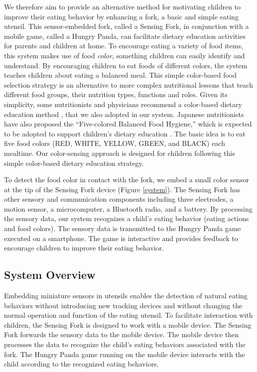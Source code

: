 We therefore aim to provide an alternative method for motivating children 
to improve their eating behavior by enhancing a fork, a basic and simple eating utensil. 
This sensor-embedded fork, called a Sensing Fork, in conjunction with a mobile game, 
called a Hungry Panda, can facilitate dietary education activities 
for parents and children at home. 
To encourage eating a variety of food items, this system makes use of food \textit{color}, 
something children can easily identify and understand. 
By encouraging children to eat foods of different colors, 
the system teaches children about eating a balanced meal. 
This simple color-based food selection strategy is an alternative 
to more complex nutritional lessons that teach different food groups, 
their nutrition types, functions and roles. 
Given its simplicity, some nutritionists and 
physicians recommend a color-based dietary education method \cite{Blackburn:2005}, 
that we also adopted in our system. Japanese nutritionists have also proposed 
the ``Five-colored Balanced Food Hygiene,'' which is expected to be adopted 
to support children's dietary education \cite{goshoku}. 
The basic idea is to eat five food colors (RED, WHITE, YELLOW, GREEN, and BLACK) each mealtime. 
Our color-sensing approach is designed for children 
following this simple color-based dietary education strategy.

To detect the food color in contact with the fork, we embed a small color sensor 
at the tip of the Sensing Fork device (Figure \ref{system}). 
The Sensing Fork has other sensory and communication components including three electrodes, 
a motion sensor, a microcomputer, a Bluetooth radio, and a battery. 
By processing the sensory data, 
our system recognizes a child's eating behavior (eating actions and food colors). 
The sensory data is transmitted to the Hungry Panda game executed on a smartphone. 
The game is interactive and provides feedback 
to encourage children to improve their eating behavior.

\subsection{System Overview}
Embedding miniature sensors in utensils enables the detection of natural eating behaviors 
without introducing new tracking devices and without changing the normal operation and function of the eating utensil. 
To facilitate interaction with children, the Sensing Fork is designed to work with a mobile device. 
The Sensing Fork forwards the sensory data to the mobile device. 
The mobile device then processes the data to recognize the child's eating behaviors associated with the fork. 
The Hungry Panda game running on the mobile device interacts 
with the child according to the recognized eating behaviors.

